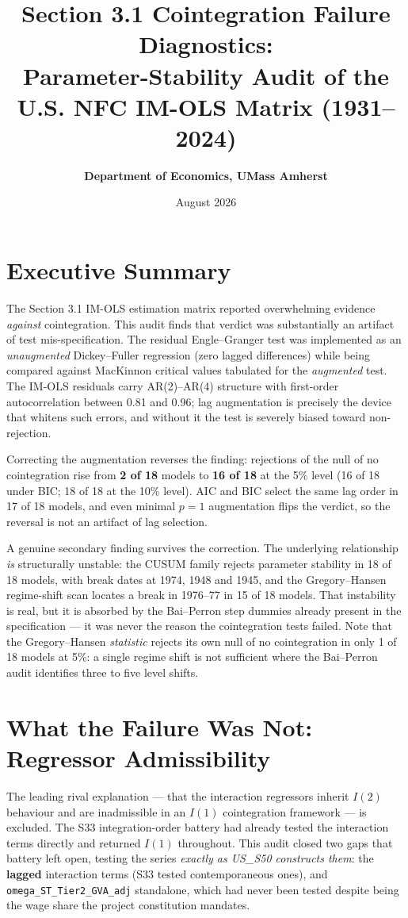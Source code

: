 \documentclass[11pt,a4paper]{article}
\title{\textbf{Section 3.1 Cointegration Failure Diagnostics:\\ Parameter-Stability Audit of the U.S. NFC IM-OLS Matrix (1931--2024)}}
\author{\textbf{Department of Economics, UMass Amherst}}
\date{August 2026}
\begin{document}
\maketitle

\section*{Executive Summary}
The Section 3.1 IM-OLS estimation matrix reported overwhelming evidence \emph{against} cointegration. This audit finds that verdict was substantially an artifact of test mis-specification. The residual Engle--Granger test was implemented as an \emph{unaugmented} Dickey--Fuller regression (zero lagged differences) while being compared against MacKinnon critical values tabulated for the \emph{augmented} test. The IM-OLS residuals carry AR(2)--AR(4) structure with first-order autocorrelation between 0.81 and 0.96; lag augmentation is precisely the device that whitens such errors, and without it the test is severely biased toward non-rejection.

Correcting the augmentation reverses the finding: rejections of the null of no cointegration rise from \textbf{2 of 18} models to \textbf{16 of 18} at the 5\% level (16 of 18 under BIC; 18 of 18 at the 10\% level). AIC and BIC select the same lag order in 17 of 18 models, and even minimal $p=1$ augmentation flips the verdict, so the reversal is not an artifact of lag selection.

A genuine secondary finding survives the correction. The underlying relationship \emph{is} structurally unstable: the CUSUM family rejects parameter stability in 18 of 18 models, with break dates at 1974, 1948 and 1945, and the Gregory--Hansen regime-shift scan locates a break in 1976--77 in 15 of 18 models. That instability is real, but it is absorbed by the Bai--Perron step dummies already present in the specification --- it was never the reason the cointegration tests failed. Note that the Gregory--Hansen \emph{statistic} rejects its own null of no cointegration in only 1 of 18 models at 5\%: a single regime shift is not sufficient where the Bai--Perron audit identifies three to five level shifts.

\FloatBarrier
\section{What the Failure Was Not: Regressor Admissibility}
The leading rival explanation --- that the interaction regressors inherit $I(2)$ behaviour and are inadmissible in an $I(1)$ cointegration framework --- is excluded. The S33 integration-order battery had already tested the interaction terms directly and returned $I(1)$ throughout. This audit closed two gaps that battery left open, testing the series \emph{exactly as US\_S50 constructs them}: the \textbf{lagged} interaction terms (S33 tested contemporaneous ones), and \texttt{omega\_ST\_Tier2\_GVA\_adj} standalone, which had never been tested despite being the wage share the project constitution mandates.
\end{document}

